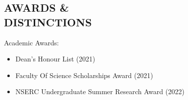 \documentclass[margin, 10pt]{res} %
\begin{document}
\begin{resume}
		
		\section{AWARDS \& \\ DISTINCTIONS}
		Academic Awards:
		\vspace*{0.15cm}
		\begin{itemize}\itemsep -2pt %
			\item Dean's Honour List (2021)
			\item Faculty Of Science Scholarships Award (2021)
			\item NSERC Undergraduate Summer Research Award (2022)
		\end{itemize}
		
		

\end{resume}
\end{document}
